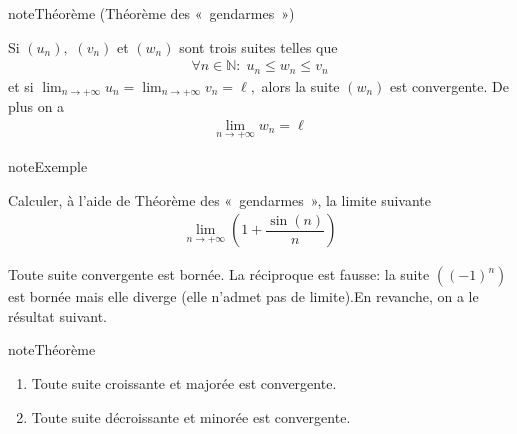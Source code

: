 \documentclass[letterpaper,10pt,french]{jupyterBook}
\begin{document}
\begin{sphinxadmonition}{note}{Théorème (Théorème des « gendarmes »)}

\sphinxAtStartPar
Si \((u_n),\) \((v_n)\) et \((w_n)\) sont trois suites telles que
\begin{equation*}
\begin{split}
\forall n\in \mathbb{N}:\; u_n\leq w_n\leq v_n
\end{split}
\end{equation*}
\sphinxAtStartPar
et si \(\lim_{n \rightarrow +\infty}u_n=\lim_{n \rightarrow +\infty}v_n=\ell,\) alors la suite \((w_n)\) est convergente. De plus on a
\begin{equation*}
\begin{split}
\lim_{n \rightarrow +\infty} w_n=\ell
\end{split}
\end{equation*}\end{sphinxadmonition}

\begin{sphinxadmonition}{note}{Exemple}

\sphinxAtStartPar
Calculer, à l’aide de Théorème des « gendarmes », la limite suivante
\begin{equation*}
\begin{split}
\lim_{n \rightarrow +\infty}(1+\dfrac{\sin (n)}{n})
\end{split}
\end{equation*}\end{sphinxadmonition}

\sphinxAtStartPar
Toute suite convergente est bornée. La réciproque est fausse: la suite \(((-1)^n)\) est bornée mais elle diverge (elle n’admet pas de limite).En revanche, on a le résultat suivant.

\begin{sphinxadmonition}{note}{Théorème}
\begin{enumerate}
%
\item {} 
\sphinxAtStartPar
Toute suite croissante et majorée est convergente.

\item {} 
\sphinxAtStartPar
Toute suite décroissante et minorée est convergente.

\end{enumerate}
\end{sphinxadmonition}
\end{document}
